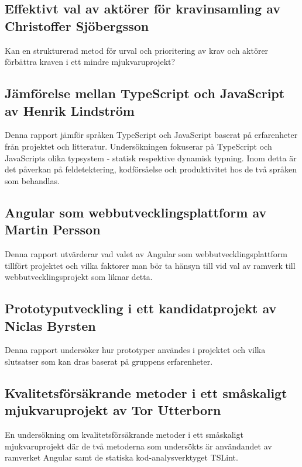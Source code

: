 \subsection{Effektivt val av aktörer för kravinsamling av Christoffer Sjöbergsson}
Kan en strukturerad metod för urval och prioritering av krav och aktörer förbättra kraven i ett mindre mjukvaruprojekt?
\subsection{Jämförelse mellan TypeScript och JavaScript av Henrik Lindström}
Denna rapport jämför språken TypeScript och JavaScript baserat på erfarenheter från projektet och litteratur. Undersökningen fokuserar på TypeScript och JavaScripts olika typsystem - statisk respektive dynamisk typning. Inom detta är det påverkan på feldetektering, kodförsåelse och produktivitet hos de två språken som behandlas.
\subsection{Angular som webbutvecklingsplattform av Martin Persson}
Denna rapport utvärderar vad valet av Angular som webbutvecklingsplattform tillfört projektet och vilka faktorer man bör ta hänsyn till vid val av ramverk till webbutvecklingsprojekt som liknar detta.  
\subsection{Prototyputveckling i ett kandidatprojekt av Niclas Byrsten}
Denna rapport undersöker hur prototyper användes i projektet och vilka slutsatser som kan dras baserat på gruppens erfarenheter.
\subsection{Kvalitetsförsäkrande metoder i ett småskaligt mjukvaruprojekt av Tor Utterborn}
En undersökning om kvalitetsförsäkrande metoder i ett småskaligt mjukvaruprojekt där de två metoderna som undersökts är användandet av ramverket Angular samt de statiska kod-analysverktyget TSLint.
